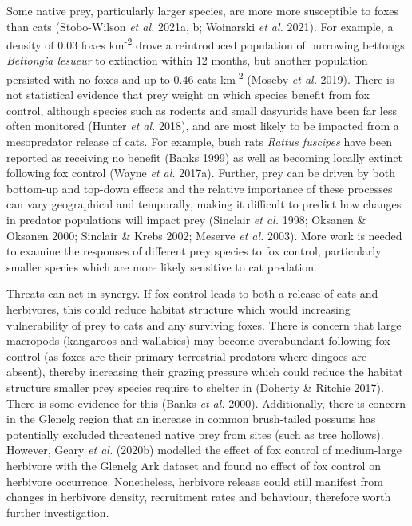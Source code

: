 \documentclass[11pt,a4paper,titlepage,twoside,openright]{style/unimelbthesis}
\begin{document}
\begin{mainmatter}
Some native prey, particularly larger species, are more more susceptible to foxes than cats (Stobo-Wilson \emph{et al.} 2021a, b; Woinarski \emph{et al.} 2021). For example, a density of 0.03 foxes km\textsuperscript{-2} drove a reintroduced population of burrowing bettongs \emph{Bettongia lesueur} to extinction within 12 months, but another population persisted with no foxes and up to 0.46 cats km\textsuperscript{-2} (Moseby \emph{et al.} 2019). There is not statistical evidence that prey weight on which species benefit from fox control, although species such as rodents and small dasyurids have been far less often monitored (Hunter \emph{et al.} 2018), and are most likely to be impacted from a mesopredator release of cats. For example, bush rats \emph{Rattus fuscipes} have been reported as receiving no benefit (Banks 1999) as well as becoming locally extinct following fox control (Wayne \emph{et al.} 2017a). Further, prey can be driven by both bottom-up and top-down effects and the relative importance of these processes can vary geographical and temporally, making it difficult to predict how changes in predator populations will impact prey (Sinclair \emph{et al.} 1998; Oksanen \& Oksanen 2000; Sinclair \& Krebs 2002; Meserve \emph{et al.} 2003). More work is needed to examine the responses of different prey species to fox control, particularly smaller species which are more likely sensitive to cat predation.

Threats can act in synergy. If fox control leads to both a release of cats and herbivores, this could reduce habitat structure which would increasing vulnerability of prey to cats and any surviving foxes. There is concern that large macropods (kangaroos and wallabies) may become overabundant following fox control (as foxes are their primary terrestrial predators where dingoes are absent), thereby increasing their grazing pressure which could reduce the habitat structure smaller prey species require to shelter in (Doherty \& Ritchie 2017). There is some evidence for this (Banks \emph{et al.} 2000). Additionally, there is concern in the Glenelg region that an increase in common brush-tailed possums has potentially excluded threatened native prey from sites (such as tree hollows). However, Geary \emph{et al.} (2020b) modelled the effect of fox control of medium-large herbivore with the Glenelg Ark dataset and found no effect of fox control on herbivore occurrence. Nonetheless, herbivore release could still manifest from changes in herbivore density, recruitment rates and behaviour, therefore worth further investigation.


\end{mainmatter}
\end{document}

